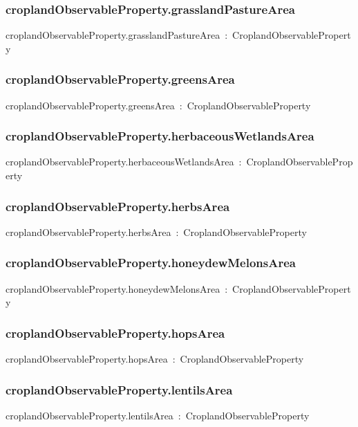 \documentclass{article}
\begin{document}
\subsubsection*{croplandObservableProperty.grasslandPastureArea}

croplandObservableProperty.grasslandPastureArea~:~CroplandObservableProperty

\subsubsection*{croplandObservableProperty.greensArea}

croplandObservableProperty.greensArea~:~CroplandObservableProperty

\subsubsection*{croplandObservableProperty.herbaceousWetlandsArea}

croplandObservableProperty.herbaceousWetlandsArea~:~CroplandObservableProperty

\subsubsection*{croplandObservableProperty.herbsArea}

croplandObservableProperty.herbsArea~:~CroplandObservableProperty

\subsubsection*{croplandObservableProperty.honeydewMelonsArea}

croplandObservableProperty.honeydewMelonsArea~:~CroplandObservableProperty

\subsubsection*{croplandObservableProperty.hopsArea}

croplandObservableProperty.hopsArea~:~CroplandObservableProperty

\subsubsection*{croplandObservableProperty.lentilsArea}

croplandObservableProperty.lentilsArea~:~CroplandObservableProperty
\end{document}
